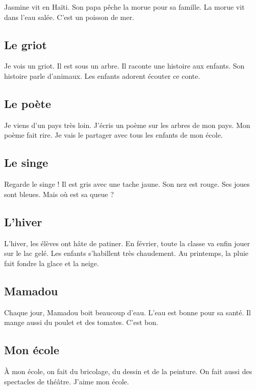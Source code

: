 \documentclass[11pt, french]{article}
\begin{document}
Jasmine vit en Haïti. Son papa pêche la morue pour sa famille. La
morue vit dans l'eau salée. C'est un poisson de mer.

\subsection{Le griot}

Je vois un griot. Il est sous un arbre. Il raconte une histoire aux
enfants. Son histoire parle d'animaux. Les enfants adorent écouter ce
conte.

\subsection{Le poète}

Je viens d'un pays très loin. J'écris un poème sur les arbres de mon
pays. Mon poème fait rire. Je vais le partager avec tous les enfants
de mon école.

\subsection{Le singe}

Regarde le singe ! Il est gris avec une tache jaune. Son nez est
rouge. Ses joues sont bleues. Mais où est sa queue ?

\subsection{L'hiver}

L'hiver, les élèves ont hâte de patiner. En février, toute la classe
va enfin jouer sur le lac gelé. Les enfants s'habillent très
chaudement. Au printemps, la pluie fait fondre la glace et la neige.

\subsection{Mamadou}

Chaque jour, Mamadou boit beaucoup d'eau. L'eau est bonne pour sa
santé. Il mange aussi du poulet et des tomates. C'est bon.

\subsection{Mon école}

À mon école, on fait du bricolage, du dessin et de la peinture. On
fait aussi des spectacles de théâtre. J'aime mon école.
\end{document}
